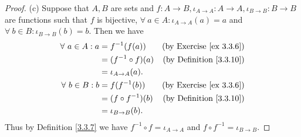 \begin{proof}{(c)}
Suppose that \(A, B\) are sets and \(f : A \to B, \iota_{A \to A} : A \to A, \iota_{B \to B} : B \to B\) are functions such that \(f\) is bijective, \(\forall\ a \in A : \iota_{A \to A}(a) = a\) and \(\forall\ b \in B : \iota_{B \to B}(b) = b\).
Then we have
\begin{align*}
\forall\ a \in A : a &= f^{-1}(f(a)) & \text{(by Exercise \ref{ex 3.3.6})} \\
&= (f^{-1} \circ f)(a) & \text{(by Definition \ref{3.3.10})} \\
&= \iota_{A \to A}(a). \\
\forall\ b \in B : b &= f(f^{-1}(b)) & \text{(by Exercise \ref{ex 3.3.6})} \\
&= (f \circ f^{-1})(b) & \text{(by Definition \ref{3.3.10})} \\
&= \iota_{B \to B}(b).
\end{align*}
Thus by Definition \ref{3.3.7} we have \(f^{-1} \circ f = \iota_{A \to A}\) and \(f \circ f^{-1} = \iota_{B \to B}\).
\end{proof}

